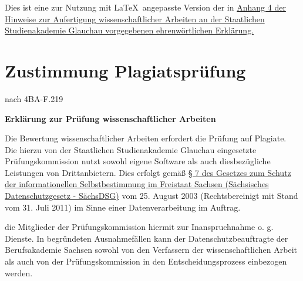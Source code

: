 {\footnotesize Dies ist eine zur Nutzung mit \LaTeX\ angepasste Version der in \href{https://www.ba-glauchau.de/fileadmin/glauchau/waehrend-des-studium/dokumente/pruefungen/4BA-F.207_Hinweise_zur_Anfertigung_wissenschaftlicher_Arbeiten.pdf}{Anhang 4 der Hinweise zur Anfertigung wissenschaftlicher Arbeiten an der Staatlichen Studienakademie Glauchau vorgegebenen ehrenwörtlichen Erklärung.}}

\newpage
\section{Zustimmung Plagiatsprüfung}

\vspace*{2mm}

\begin{minipage}{0.5\columnwidth}

\end{minipage}
\begin{minipage}{0.45\columnwidth}
\begin{flushright}
{\small nach 4BA-F.219\\}
\end{flushright}
\end{minipage}
\vspace*{2mm}

\begin{center}\textbf{\huge{Erklärung zur Prüfung wissenschaftlicher Arbeiten}}\end{center}

Die Bewertung wissenschaftlicher Arbeiten erfordert die Prüfung auf Plagiate. Die hierzu von der Staatlichen Studienakademie Glauchau eingesetzte Prüfungskommission nutzt sowohl eigene Software als auch diesbezügliche Leistungen von Drittanbietern. Dies erfolgt gemäß \href{https://www.revosax.sachsen.de/vorschrift/1672-Saechsisches-Datenschutzgesetz#p7}{§ 7 des Gesetzes zum Schutz der informationellen Selbstbestimmung im Freistaat Sachsen (Sächsisches Datenschutzgesetz - SächsDSG)} vom 25. August 2003 (Rechtsbereinigt mit Stand vom 31. Juli 2011) im Sinne einer Datenverarbeitung im Auftrag.

die Mitglieder der Prüfungskommission hiermit zur Inanspruchnahme o. g. Dienste. In begründeten Ausnahmefällen kann der Datenschutzbeauftragte der Berufsakademie Sachsen sowohl von den Verfassern der wissenschaftlichen Arbeit als auch von der Prüfungskommission in den Entscheidungsprozess einbezogen werden.


